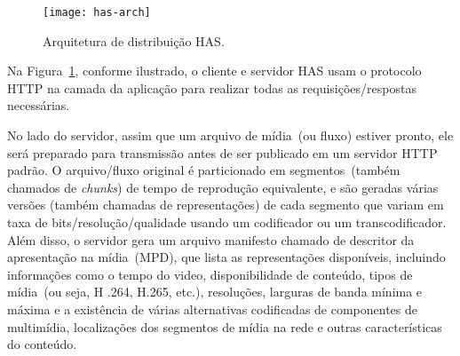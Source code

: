 \vspace{0.5cm}
\begin{figure}[htb]
  \centering
  \texttt{[image: has-arch]}
  \caption{Arquitetura de distribuição HAS.}
  \label{fig:has-arch}
\end{figure}

%

Na Figura~\ref{fig:has-arch}, conforme ilustrado, o cliente e servidor HAS usam o protocolo HTTP na camada da aplicação para realizar todas as requisições/respostas necessárias. 

No lado do servidor, assim que um arquivo de mídia~(ou fluxo) estiver pronto, ele será preparado para transmissão antes de ser publicado em um servidor HTTP padrão. O arquivo/fluxo original é particionado em segmentos~(também chamados de \textit{chunks}) de tempo de reprodução equivalente, e são geradas várias versões (também chamadas de representações) de cada segmento que variam em taxa de bits/resolução/qualidade usando um codificador ou um transcodificador. 
Além disso, o servidor gera um arquivo manifesto chamado de descritor da apresentação na mídia~(MPD), que lista as representações disponíveis, incluindo informações como o tempo do video, disponibilidade de conteúdo, tipos de mídia~(ou seja, H .264, H.265, etc.), resoluções, larguras de banda mínima e máxima e a existência de várias alternativas codificadas de componentes de multimídia, localizações dos segmentos de mídia na rede e outras características do conteúdo.

